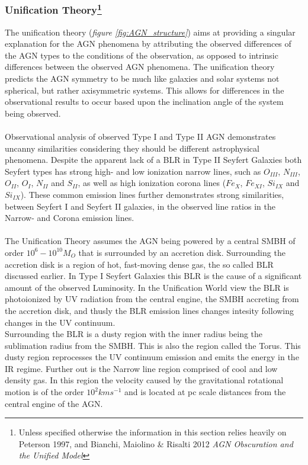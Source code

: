 \documentclass[a4paper, 12pt, twoside]{article}
\begin{document}
\subsubsection[Unification Theory]{Unification Theory\footnote{Unless specified otherwise the information in this section relies heavily on Peterson 1997, and Bianchi, Maiolino \& Risalti 2012 \emph{AGN Obscuration and the Unified Model}\cite{Bianchi2012}}} \label{unification}
The unification theory (\emph{figure \ref{fig:AGN_structure}}) aims at providing a singular explanation for the AGN phenomena by attributing the observed differences of the AGN types to the conditions of the observation, as opposed to intrinsic differences between the observed AGN phenomena. The unification theory predicts the AGN symmetry to be much like galaxies and solar systems not spherical, but rather axisymmetric systems. This allows for differences in the observational results to occur based upon the inclination angle of the system being observed. \\
\\
Observational analysis of observed Type I and Type II AGN demonstrates uncanny similarities considering they should be different astrophysical phenomena. Despite the apparent lack of a BLR in Type II Seyfert Galaxies both Seyfert types has strong high- and low ionization narrow lines, such as $O_{III}$, $N_{III}$, $O_{II}$, $O_{I}$, $N_{II}$ and $S_{II}$, as well as high ionization corona lines ($Fe_{X}$, $Fe_{XI}$, $Si_{IX}$ and $Si_{IX}$). These common emission lines further demonstrates strong similarities, between Seyfert I and Seyfert II galaxies, in the observed line ratios in the Narrow- and Corona emission lines. 
\\
\\
The Unification Theory assumes the AGN being powered by a central SMBH of order $10^6-10^{10} M_O$ that is surrounded by an accretion disk. Surrounding the accretion disk is  a region of hot, fast-moving dense gas, the so called BLR discussed earlier. In Type I Seyfert Galaxies this BLR is the cause of a significant amount of the observed Luminosity. In the Unification World view the BLR is photoionized by UV radiation from the central engine, the SMBH accreting from the accretion disk, and thusly the BLR emission lines changes intesity following changes in the UV continuum. \\
Surrounding the BLR is a dusty region with the inner radius being the sublimation radius from the SMBH. This is also the region called the Torus. This dusty region reprocesses the UV continuum emission and emits the energy in the IR regime. Further out is the Narrow line region comprised of cool and low density gas. In this region the velocity caused by the gravitational rotational motion is of the order $10^2 kms^{-1}$ and is located at pc scale distances from the central engine of the AGN.\\
\end{document}
